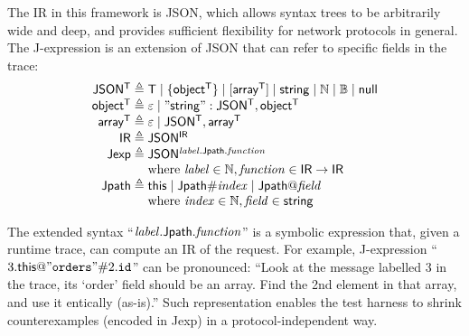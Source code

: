The IR in this framework is JSON, which allows syntax trees to be arbitrarily
wide and deep, and provides sufficient flexibility for network protocols in
general.  The J-expression is an extension of JSON that can refer to specific
fields in the trace:
\[\begin{array}{r@{\;}l}
\mathsf{JSON^T}\triangleq&\mathsf T\mid\{\mathsf{object^T}\}\mid[\mathsf{array^T}]\mid\mathsf{string}\mid\Nat\mid\Bool\mid\mathsf{null}\\
\mathsf{object^T}\triangleq&\nil\mid\mathsf{"string": JSON^T,object^T}\\
\mathsf{array^T}\triangleq&\nil\mid\mathsf{JSON^T,array^T}\\
\mathsf{IR}\triangleq&\mathsf{JSON^{IR}}\\
\mathsf{Jexp}\triangleq&\mathsf{JSON^{\Jref{\mathit{label}}{\mathsf{Jpath}}{\mathit{function}}}}\\
&\text{where }\mathit{label}\in\Nat,\mathit{function}\in\mathsf{IR}\to\mathsf{IR}\\
\Jpath\triangleq&\This\mid\Jpath\Number\mathit{index}\mid\Jpath\At\mathit{field}\\
&\text{where }\mathit{index}\in\Nat,\mathit{field}\in\mathsf{string}
\end{array}\]

The extended syntax
``$\mathit{label}.\mathsf{Jpath}.\mathit{function}$'' is a symbolic
expression that, given a runtime trace, can compute an IR of the request.  For
example, J-expression
``$3.\mathsf{this}@\mathtt{"orders"}\#2.\mathtt{id}$'' can be
pronounced: ``Look at the message labelled 3 in the trace, its `order' field
should be an array.  Find the 2nd element in that array, and use it
entically (as-is).''  Such representation enables the test harness to
shrink counterexamples (encoded in Jexp) in a protocol-independent way.



